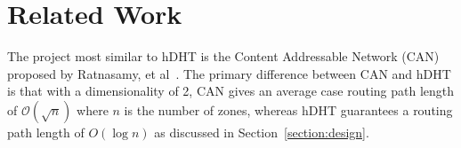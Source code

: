 \section{Related Work} \label{section:related-work}
The project most similar to hDHT is the Content Addressable Network (CAN) proposed by Ratnasamy, et al~\cite{ratnasamy2001scalable}. The primary difference between CAN and hDHT is that with a dimensionality of 2, CAN gives an average case routing path length of $\mathcal{O}(\sqrt n)$ where $n$ is the number of zones, whereas hDHT guarantees a routing path length of $O(\log n)$ as discussed in Section~\ref{section:design}.